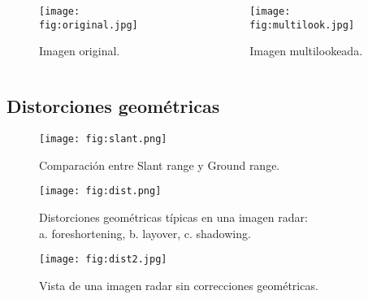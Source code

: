 \begin{frame}{} \vskip0cm
  \begin{columns}
  \begin{column}{0.5\textwidth}
    \begin{figure}
      \centering
      \texttt{[image: fig:original.jpg]}
      \caption{Imagen original.}
      \label{}
    \end{figure}
  \end{column}
  \begin{column}{0.5\textwidth}  %
    \begin{figure}
      \centering
      \texttt{[image: fig:multilook.jpg]}
      \caption{Imagen multilookeada.}
      \label{}
    \end{figure}
  \end{column}
  \end{columns}
\end{frame}


\subsection{Distorciones geométricas}

\begin{frame}{} \vskip0cm
      \begin{figure}
        \centering
        \texttt{[image: fig:slant.png]}
        \caption{Comparación entre Slant range y Ground range.}
        \label{}
      \end{figure}
\end{frame}

\begin{frame}{} \vskip0cm
      \begin{figure}
        \centering
        \texttt{[image: fig:dist.png]}
        \caption{Distorciones geométricas típicas en una imagen radar:\\ {\centering a. foreshortening, b. layover, c. shadowing.}}
        \label{}
      \end{figure}
\end{frame}

\begin{frame}{} \vskip0cm
    \begin{figure}
      \centering
      \texttt{[image: fig:dist2.jpg]}
      \caption{Vista de una imagen radar sin correcciones geométricas.}
      \label{}
    \end{figure}
\end{frame}

